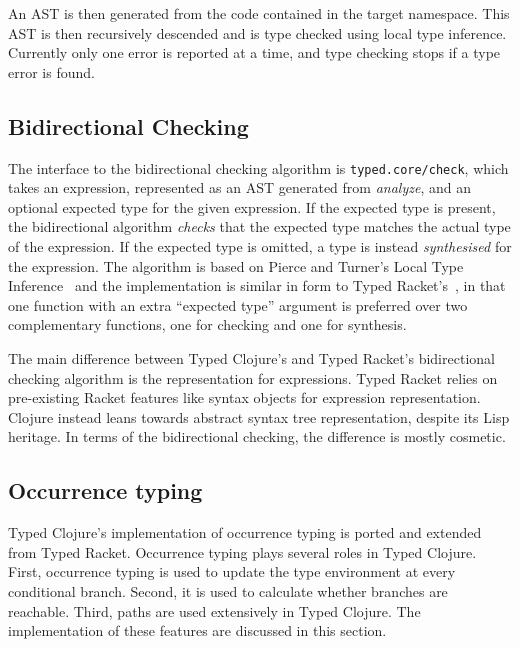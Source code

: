 An AST is then generated from the code contained in the target namespace.
This AST is then recursively descended and is type checked using local type inference.
Currently only one error is reported at a time, and type checking stops if a type error
is found.

\subsection{Bidirectional Checking}

The interface to the bidirectional checking algorithm is \lstinline|typed.core/check|,
which takes an expression, represented as an AST generated from \emph{analyze}, and an optional expected type for
the given expression. If the expected type is present, the bidirectional algorithm \emph{checks}
that the expected type matches the actual type of the expression.
If the expected type is omitted, a type is instead \emph{synthesised} for the expression.
The algorithm is based on Pierce and Turner's  Local Type Inference~\cite{PT00}
and the implementation is similar in form to Typed Racket's~\cite{TF08}, in that
one function with an extra ``expected type'' argument is preferred over two complementary
functions, one for checking and one for synthesis.

The main difference between Typed Clojure's and Typed Racket's bidirectional checking
algorithm is the representation for expressions. Typed Racket relies on pre-existing
Racket features like syntax objects for expression representation. Clojure instead
leans towards abstract syntax tree representation, despite its Lisp heritage.
In terms of the bidirectional checking, the difference is mostly cosmetic.



\subsection{Occurrence typing}

Typed Clojure's implementation of occurrence typing is ported and extended from Typed Racket.
Occurrence typing plays several roles in Typed Clojure.
First, occurrence typing is used to update the type environment at every conditional branch.
Second, it is used to calculate whether branches are reachable.
Third, paths are used extensively in Typed Clojure. 
The implementation of these features are discussed in this section.


